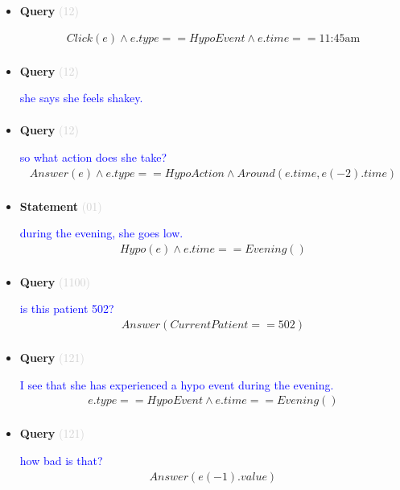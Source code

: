 \documentclass[11pt]{article}
\newcommand{\key}[1]{\textcolor{lightgray}{#1}}
\newcounter{CQuery}
\newcounter{CStatement}
\begin{document}
\begin{itemize}
\item
\textbf{Query\theCQuery} \key{(12)} \addtocounter{CQuery}{1}
\textcolor{blue}{  }
\begin{multline*}
Click(e) \wedge e.type == HypoEvent \wedge e.time == \mbox{11:45am} \\ 
\end{multline*}


\item
\textbf{Query\theCQuery} \key{(12)} \addtocounter{CQuery}{1}
\textcolor{blue}{ she says she feels shakey. }
\begin{multline*}
\end{multline*}


\item
\textbf{Query\theCQuery} \key{(12)} \addtocounter{CQuery}{1}
\textcolor{blue}{ so what action does she take? }
\begin{multline*}
Answer(e) \wedge e.type == HypoAction \wedge Around(e.time, e(-2).time) \\ 
\end{multline*}


\item
\textbf{Statement\theCStatement} \key{(01)} \addtocounter{CStatement}{1}
\textcolor{blue}{ during the evening, she goes low. }
\begin{multline*}
Hypo(e) \wedge e.time==Evening() \\ 
\end{multline*}


\item
\textbf{Query\theCQuery} \key{(1100)} \addtocounter{CQuery}{1}
\textcolor{blue}{ is this patient 502? }
\begin{multline*}
Answer(CurrentPatient==502) \\ 
\end{multline*}


\item
\textbf{Query\theCQuery} \key{(121)} \addtocounter{CQuery}{1}
\textcolor{blue}{ I see that she has experienced a hypo event during the evening. }
\begin{multline*}
e.type==HypoEvent \wedge e.time==Evening() \\ 
\end{multline*}


\item
\textbf{Query\theCQuery} \key{(121)} \addtocounter{CQuery}{1}
\textcolor{blue}{ how bad is that? }
\begin{multline*}
Answer(e(-1).value) \\ 
\end{multline*}



\end{itemize}
\end{document}
